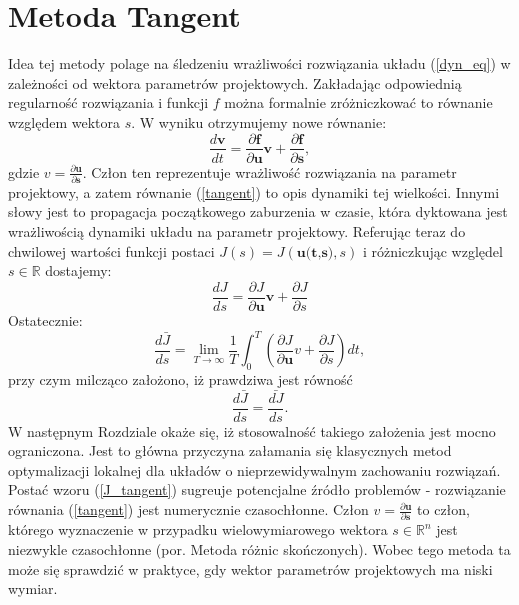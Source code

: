 \documentclass[12pt, twoside]{book}
\begin{document}
\section{Metoda Tangent}
Idea tej metody polage na śledzeniu wrażliwości rozwiązania układu (\ref{dyn_eq}) w zależności od wektora parametrów projektowych. Zakładając odpowiednią regularność rozwiązania i funkcji $ f $ można formalnie zróżniczkować to równanie względem wektora $ s $. W wyniku otrzymujemy nowe równanie:
\begin{equation}
\frac{d{\textbf{v}}}{d{t}} = \frac{\partial{\textbf{f}}}{\partial{\textbf{u}}}\textbf{v} + \frac{\partial{\textbf{f}}}{\partial{\textbf{s}}}
\label{tangent},
\end{equation}
gdzie $ v = \frac{\partial{\textbf{u}}}{\partial{\textbf{s}}} $. Człon ten reprezentuje wrażliwość rozwiązania na parametr projektowy, a zatem równanie (\ref{tangent}) to opis dynamiki tej wielkości. Innymi słowy jest to propagacja początkowego zaburzenia w czasie, która dyktowana jest wrażliwością dynamiki układu na parametr projektowy. Referując teraz do chwilowej wartości funkcji postaci $ J(s) = J(\textbf{u(t,s)},s) $ i różniczkując względel $ s \in \mathbb{R} $ dostajemy:
\begin{equation}
\frac{dJ}{ds} = \frac{\partial{J}}{\partial{\textbf{u}}}\textbf{v} + \frac{\partial{J}}{\partial{s}}
\end{equation} 
Ostatecznie:
\begin{equation}
\frac{d\bar{J}}{ds} = \lim\limits_{T \rightarrow \infty}\frac{1}{T}\int_{0}^{T}(\frac{\partial{J}}{\partial{\textbf{u}}}v + \frac{\partial{J}}{\partial{s}})dt,
\label{J_tangent}
\end{equation}
przy czym milcząco założono, iż prawdziwa jest równość 
\begin{equation}
\frac{d\bar{J}}{ds} = \bar{\frac{dJ}{ds}}.
\label{djbar_bardj}
\end{equation}
W następnym Rozdziale okaże się, iż stosowalność takiego założenia jest mocno ograniczona. Jest to główna przyczyna załamania się klasycznych metod optymalizacji lokalnej dla układów o nieprzewidywalnym zachowaniu rozwiązań. \newline
Postać wzoru (\ref{J_tangent}) sugreuje potencjalne źródło problemów - rozwiązanie równania (\ref{tangent}) jest numerycznie czasochłonne. Człon $ v = \frac{\partial{\textbf{u}}}{\partial{\textbf{s}}} $ to człon, którego wyznaczenie w przypadku wielowymiarowego wektora $ s \in \mathbb{R}^n $ jest niezwykle czasochłonne (por. Metoda różnic skończonych). Wobec tego metoda ta może się sprawdzić w praktyce, gdy wektor parametrów projektowych ma niski wymiar.
\end{document}
